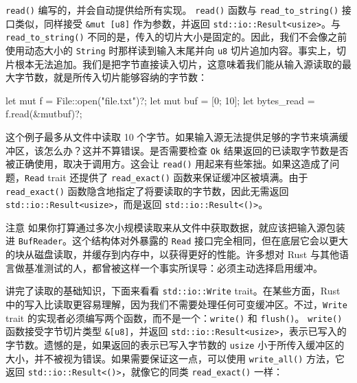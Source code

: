 \texttt{read()} 编写的，并会自动提供给所有实现。
\texttt{read()} 函数与 \texttt{read\_\allowbreak{}to\_\allowbreak{}string(\allowbreak{})\allowbreak{}} 接口类似，同样接受 \texttt{\&mut [u8]} 作为参数，并返回 \texttt{std::\allowbreak{}io::\allowbreak{}Result<\allowbreak{}usize>\allowbreak{}}。与 \texttt{read\_\allowbreak{}to\_\allowbreak{}string(\allowbreak{})\allowbreak{}} 不同的是，传入的切片大小是固定的。因此，我们不会像之前使用动态大小的 \texttt{String} 时那样读到输入末尾并向 \texttt{u8} 切片追加内容。事实上，切片根本无法追加。我们是把字节直接读入切片，这意味着我们能从输入源读取的最大字节数，就是所传入切片能够容纳的字节数：
\begin{codebox}[rust]
let mut f = File::open("file.txt")?;
let mut buf = [0; 10];
let bytes_read = f.read(&mutbuf)?;
\end{codebox}
\label{idx:idx_8c066055}
这个例子最多从文件中读取 10 个字节。如果输入源无法提供足够的字节来填满缓冲区，该怎么办？这并不算错误。是否需要检查 \texttt{Ok} 结果返回的已读取字节数是否被正确使用，取决于调用方。这会让 \texttt{read()} 用起来有些笨拙。如果这造成了问题，\texttt{Read} trait 还提供了 \texttt{read\_\allowbreak{}exact(\allowbreak{})\allowbreak{}} 函数来保证缓冲区被填满。由于 \texttt{read\_\allowbreak{}exact(\allowbreak{})\allowbreak{}} 函数隐含地指定了将要读取的字节数，因此无需返回
\texttt{std::\allowbreak{}io::\allowbreak{}Result<\allowbreak{}usize>\allowbreak{}}，而是返回 \texttt{std::\allowbreak{}io::\allowbreak{}Result<\allowbreak{}(\allowbreak{})\allowbreak{}>\allowbreak{}}。
\begin{myNotic}{注意}
如果你打算通过多次小规模读取来从文件中获取数据，就应该把输入源包装进 \texttt{BufReader}。这个结构体对外暴露的 \texttt{Read} 接口完全相同，但在底层它会以更大的块从磁盘读取，并缓存到内存中，以获得更好的性能。许多想对 Rust 与其他语言做基准测试的人，都曾被这样一个事实所误导：必须主动选择启用缓冲。
\end{myNotic}
讲完了读取的基础知识，下面来看看 \texttt{std::\allowbreak{}io::\allowbreak{}Write} trait。在某些方面，Rust 中的写入比读取更容易理解，因为我们不需要处理任何可变缓冲区。不过，\texttt{Write} trait 的实现者必须编写两个函数，而不是一个：\texttt{write()} 和 \texttt{flush()}。
\texttt{write()} 函数接受字节切片类型 \texttt{\&[u8]}，并返回 \texttt{std::\allowbreak{}io::\allowbreak{}Result<\allowbreak{}usize>\allowbreak{}}，表示已写入的字节数。遗憾的是，如果返回的表示已写入字节数的 \texttt{usize} 小于所传入缓冲区的大小，并不被视为错误。如果需要保证这一点，可以使用 \texttt{write\_\allowbreak{}all(\allowbreak{})\allowbreak{}} 方法，它返回
\texttt{std::\allowbreak{}io::\allowbreak{}Result<\allowbreak{}(\allowbreak{})\allowbreak{}>\allowbreak{}}，就像它的同类 \texttt{read\_\allowbreak{}exact(\allowbreak{})\allowbreak{}} 一样：
